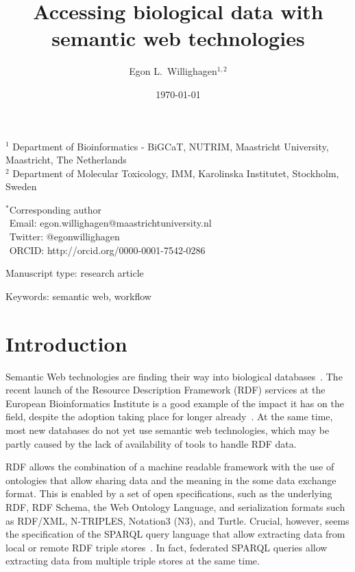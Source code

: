 \documentclass[12pt]{article}
\title{Accessing biological data with semantic web technologies}
\author{Egon L.\ Willighagen$^{1,2}$}
\begin{document}
\date{\today}
\maketitle

\noindent
$^1$ Department of Bioinformatics - BiGCaT, NUTRIM, Maastricht University, Maastricht, The Netherlands \\
$^2$ Department of Molecular Toxicology, IMM, Karolinska Institutet, Stockholm, Sweden

\bigskip
\noindent
$^*$Corresponding author\\
$\phantom{^*}$Email: egon.willighagen@maastrichtuniversity.nl\\
$\phantom{^*}$Twitter: @egonwillighagen\\
$\phantom{^*}$ORCID: http://orcid.org/0000-0001-7542-0286

\bigskip
\noindent
Manuscript type: research article

\bigskip
\noindent Keywords: semantic web, workflow

\newpage
\begin{abstract}
\end{abstract}

\section{Introduction}

Semantic Web technologies are finding their way into biological
databases~\cite{Belleau2008,Chen2010,Samwald2011,Williams2012,Willighagen2013}. The recent launch of the
Resource Description Framework (RDF) services at the European Bioinformatics Institute is a good example
of the impact it has on the field, despite the adoption taking place for longer already~\cite{EBIRDFPlatform}.
At the same time, most new databases do not yet use semantic web technologies, which may be partly
caused by the lack of availability of tools to handle RDF data.

RDF allows the combination of a machine readable framework with the use of ontologies that allow
sharing data and the meaning in the some data exchange format. This is enabled by a set of open
specifications, such as the underlying RDF, RDF Schema, the Web Ontology Language, and serialization formats
such as RDF/XML, N-TRIPLES, Notation3 (N3), and Turtle. Crucial, however, seems the specification of the SPARQL
query language that allow extracting data from local or remote RDF triple stores~\cite{Seaborne2009}. In fact,
federated SPARQL queries allow extracting data from multiple triple stores at the same time.
\end{document}
